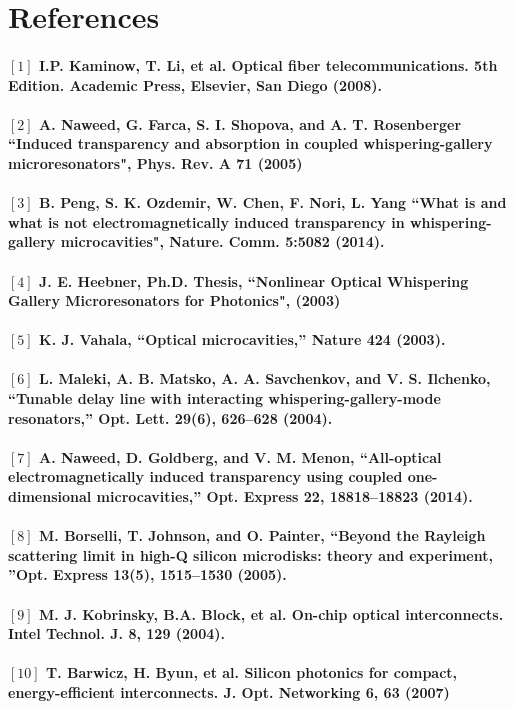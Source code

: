 \newpage
\section*{References}

\paragraph{\normalfont \large $[1]$ I.P. Kaminow, T. Li, et al. Optical fiber telecommunications. 5th Edition. Academic Press, Elsevier, San Diego (2008). \\ 
\\$[2]$ A. Naweed, G. Farca, S. I. Shopova, and A. T. Rosenberger “Induced transparency and absorption in coupled whispering-gallery microresonators", Phys. Rev. A \textbf{71} (2005)\\
\\$[3]$ B. Peng, S. K. Ozdemir, W. Chen, F. Nori, L. Yang “What is and what is not electromagnetically induced transparency in whispering-gallery microcavities", Nature. Comm. \textbf{5}:5082 (2014). \\
\\$[4]$ J. E. Heebner, Ph.D. Thesis, “Nonlinear Optical Whispering Gallery Microresonators for Photonics", (2003)  \\
\\$[5]$ K. J. Vahala, “Optical microcavities,” Nature \textbf{424} (2003).\\
\\$[6]$ L. Maleki, A. B. Matsko, A. A. Savchenkov, and V. S. Ilchenko, “Tunable delay line with interacting
whispering-gallery-mode resonators,” Opt. Lett. 29(6), 626–628 (2004).\\
\\$[7]$ A. Naweed, D. Goldberg, and V. M. Menon, “All-optical electromagnetically induced transparency using
coupled one-dimensional microcavities,” Opt. Express 22, 18818–18823 (2014).\\
\\$[8]$ M. Borselli, T. Johnson, and O. Painter, “Beyond the Rayleigh scattering limit in high-Q silicon microdisks:
theory and experiment, ”Opt. Express 13(5), 1515–1530 (2005).\\
\\$[9]$ M. J. Kobrinsky, B.A. Block, et al. On-chip optical interconnects. Intel Technol. J. \textbf{8}, 129 (2004).\\
\\$[10]$ T. Barwicz, H. Byun, et al. Silicon photonics for compact, energy-efficient interconnects. J. Opt. Networking \textbf{6}, 63 (2007)\\
}
